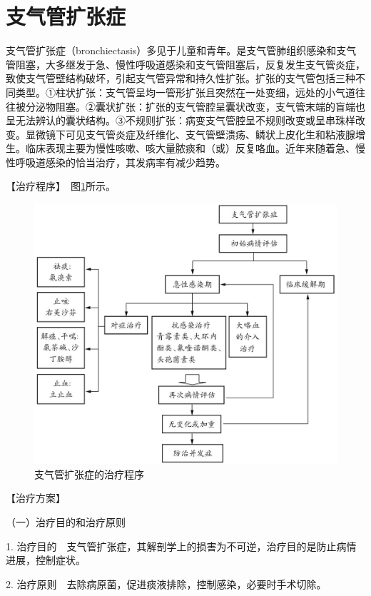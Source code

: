 \section{支气管扩张症}

支气管扩张症（bronchiectasis）多见于儿童和青年。是支气管肺组织感染和支气管阻塞，大多继发于急、慢性呼吸道感染和支气管阻塞后，反复发生支气管炎症，致使支气管壁结构破坏，引起支气管异常和持久性扩张。扩张的支气管包括三种不同类型。①柱状扩张：支气管呈均一管形扩张且突然在一处变细，远处的小气道往往被分泌物阻塞。②囊状扩张：扩张的支气管腔呈囊状改变，支气管末端的盲端也呈无法辨认的囊状结构。③不规则扩张：病变支气管腔呈不规则改变或呈串珠样改变。显微镜下可见支气管炎症及纤维化、支气管壁溃疡、鳞状上皮化生和粘液腺增生。临床表现主要为慢性咳嗽、咳大量脓痰和（或）反复咯血。近年来随着急、慢性呼吸道感染的恰当治疗，其发病率有减少趋势。

【治疗程序】　图\ref{fig1-12-1}所示。

\begin{figure}[!htbp]
 \centering
 \includegraphics{./images/Image00027.jpg}
 \captionsetup{justification=centering}
 \caption{支气管扩张症的治疗程序}
 \label{fig1-12-1}
  \end{figure} 

【治疗方案】

{（一）治疗目的和治疗原则}

1.
治疗目的　支气管扩张症，其解剖学上的损害为不可逆，治疗目的是防止病情进展，控制症状。

2. 治疗原则　去除病原菌，促进痰液排除，控制感染，必要时手术切除。

